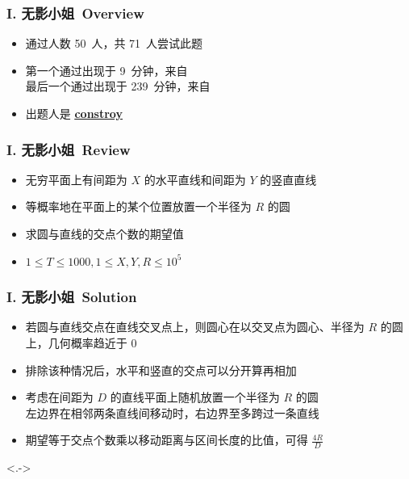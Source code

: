 \documentclass[notheorems]{beamer}
\newcommand{\zhProbI}{无影小姐}		\newcommand{\AuthProbI}{\textbf{\underline{\href{http://codeforces.com/profile/constroy}{constroy}}}}
\newcommand{\AccInProbI}{50}	\newcommand{\SubInProbI}{71}	\newcommand{\RatInProbI}{70.42\%}
\newcommand{\FirPenInProbI}{9}		\newcommand{\FirPerInProbI}{\NONE}
\newcommand{\LasPenInProbI}{239}	\newcommand{\LasPerInProbI}{\NONE}
\begin{document}
\begin{frame}[label = ProbI]
\frametitle{I. \zhProbI\ Overview}
\begin{spacing}{2.0} \large
\begin{itemize}[<+->]
\item 通过人数 \AccInProbI\ 人，共 \SubInProbI\ 人尝试此题
\item 第一个通过出现于 \FirPenInProbI\ 分钟，来自 \FirPerInProbI\ 
\\ 最后一个通过出现于 \LasPenInProbI\ 分钟，来自 \LasPerInProbI\ 
\item 出题人是 \AuthProbI\ 
\end{itemize}
\end{spacing}
\end{frame}
\begin{frame}
\frametitle{I. \zhProbI\ Review}
\begin{spacing}{2.0} \large
\begin{itemize}[<+->]
\item 无穷平面上有间距为 $X$ 的水平直线和间距为 $Y$ 的竖直直线
\item \alert{等概率地}在平面上的某个位置放置一个半径为 $R$ 的圆
\item 求圆与直线的交点个数的\alert{期望值}
\item $1 \leq T \leq 1000, 1 \leq X, Y, R \leq 10^5$
\end{itemize}
\end{spacing}
\end{frame}
\begin{frame}
\frametitle{I. \zhProbI\ Solution}
\begin{spacing}{2.0} \large
\begin{itemize}[<+->]
\item 若圆与直线交点在直线交叉点上，则圆心在以交叉点为圆心、半径为 $R$ 的圆上，几何概率趋近于 $0$
\item 排除该种情况后，水平和竖直的交点可以分开算再相加
\item 考虑在间距为 $D$ 的直线平面上随机放置一个半径为 $R$ 的圆 \\ 左边界在相邻两条直线间移动时，右边界\alert{至多跨过一条直线}
\item 期望等于交点个数乘以移动距离与区间长度的比值，可得 $\frac{4 R}{D}$

\end{itemize}
\end{spacing}
\visible<.->{\hyperlink{Overview}{}}
\end{frame}
\end{document}
